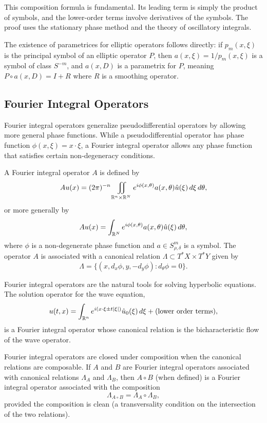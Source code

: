 This composition formula is fundamental. Its leading term is simply the
product of symbols, and the lower-order terms involve derivatives of the
symbols. The proof uses the stationary phase method and the theory of
oscillatory integrals.

The existence of parametrices for elliptic operators follows directly:
if \(p_m(x,\xi)\) is the principal symbol of an elliptic operator \(P\),
then \(a(x,\xi) = 1/p_m(x,\xi)\) is a symbol of class \(S^{-m}\), and
\(a(x,D)\) is a parametrix for \(P\), meaning \(P \circ a(x,D) = I + R\)
where \(R\) is a smoothing operator.

\subsection{Fourier Integral Operators}

Fourier integral operators generalize pseudodifferential operators by
allowing more general phase functions. While a pseudodifferential
operator has phase function \(\phi(x,\xi) = x \cdot \xi\), a Fourier
integral operator allows any phase function that satisfies certain
non-degeneracy conditions.

\begin{definition}
A Fourier integral operator \(A\) is defined by
\[
A u(x) = (2\pi)^{-n} \iint_{\mathbb{R}^n \times \mathbb{R}^N}
e^{i\phi(x,\theta)} a(x,\theta) \hat u(\xi) \,d\xi\,d\theta,
\]
or more generally by
\[
A u(x) = \int_{\mathbb{R}^N} e^{i\phi(x,\theta)} a(x,\theta) \hat u(\xi) \,d\theta,
\]
where \(\phi\) is a non-degenerate phase function and
\(a \in S^m_{\rho,\delta}\) is a symbol. The operator \(A\) is
associated with a canonical relation \(\Lambda \subset T^*X \times T^*Y\)
given by
\[
\Lambda = \{(x, d_x\phi, y, -d_y\phi) : d_\theta\phi = 0\}.
\]
\end{definition}

Fourier integral operators are the natural tools for solving hyperbolic
equations. The solution operator for the wave equation,
\[
u(t, x) = \int_{\mathbb{R}^n} e^{i(x \cdot \xi \pm t|\xi|)}
\hat u_0(\xi) \,d\xi + \text{(lower order terms)},
\]
is a Fourier integral operator whose canonical relation is the
bicharacteristic flow of the wave operator.

\begin{theorem}
Fourier integral operators are closed under composition when the
canonical relations are composable. If \(A\) and \(B\) are Fourier
integral operators associated with canonical relations \(\Lambda_A\)
and \(\Lambda_B\), then \(A \circ B\) (when defined) is a Fourier
integral operator associated with the composition
\[
\Lambda_{A \circ B} = \Lambda_A \circ \Lambda_B,
\]
provided the composition is clean (a transversality condition on the
intersection of the two relations).
\end{theorem}

